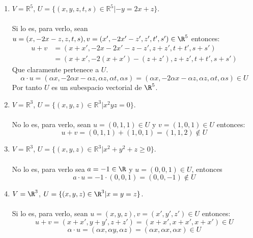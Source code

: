 \begin{ejercicio}
\begin{enumerate}[label=\alph*)]
		\item $V = \mathbb{R}^5$, $U = \{(x,y,z,t,s) \in \mathbb{R}^5 | -y = 2x + z\}$.
		      \\ \\Si lo es, para verlo, sean $u = (x, -2x-z, z, t, s), v = (x', -2x'-z', z', t', s') \in \R^5$ entonces:
		      \begin{align*}
			      u + v & = (x + x', -2x - 2x' - z - z', z + z', t + t', s + s') \\&= (x + x', -2(x + x') - (z + z'), z + z', t + t', s + s')
		      \end{align*}
		      Que claramente pertenece a $U$.
		      \begin{equation*}
			      \alpha \cdot u = (\alpha x, -2\alpha x - \alpha z, \alpha z, \alpha t, \alpha s) = (\alpha x, -2\alpha x - \alpha z, \alpha z, \alpha t, \alpha s) \in U
		      \end{equation*}
		      Por tanto $U$ es un subespacio vectorial de $\R^5$.
		\item $V = \mathbb{R}^3$, $U = \{(x,y,z) \in \mathbb{R}^3 | x^2 yz = 0\}$.
		      \\ \\No lo es, para verlo, sean $ u = (0,1,1) \in U $ y $ v = (1,0,1) \in U $ entonces:
		      \begin{equation*}
			      u + v = (0,1,1) + (1,0,1) = (1,1,2) \notin U
		      \end{equation*}
		\item $V = \mathbb{R}^3$, $U = \{(x,y,z) \in \mathbb{R}^3 | x^2 + y^2 + z \geq 0\}$.
		      \\ \\No lo es, para verlo sea $a = -1 \in \R$ y $u = (0,0,1) \in U$, entonces
		      \begin{equation*}
			      a \cdot u = -1 \cdot (0,0,1) = (0,0,-1) \notin U
		      \end{equation*}
		\item $V = \R^3$, $U = \{(x,y,z) \in \R^3 | x = y = z\}$.
		      \\ \\Si lo es, para verlo, sean $u = (x,y,z), v = (x',y',z') \in U$ entonces:
		      \begin{equation*}
			      u + v = (x + x', y + y', z + z') = (x + x', x + x', x + x') \in U
		      \end{equation*}
		      \begin{equation*}
			      \alpha \cdot u = (\alpha x, \alpha y, \alpha z) = (\alpha x, \alpha x, \alpha x) \in U
		      \end{equation*}

\end{enumerate}
\end{ejercicio}
